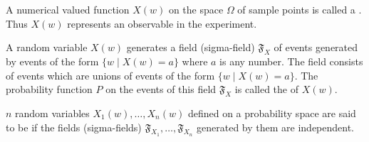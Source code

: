 A numerical valued function $X(w)$ on the space $\Omega$ of sample points is called a . Thus $X(w)$ represents an observable in the experiment.

A random variable $X(w)$ generates a field (sigma-field) $\mathfrak{F}_X$ of events generated by events of the form $\{w \mid X(w) = a\}$ where $a$ is any number. The field consists of events which are unions of events of the form $\{w \mid X(w) = a\}$. The probability function $P$ on the events of this field $\mathfrak{F}_X$ is called the  of $X(w)$.

$n$ random variables $X_1(w), \ldots, X_n(w)$ defined on a probability space are said to be  if the fields (sigma-fields) $\mathfrak{F}_{X_1}, \ldots, \mathfrak{F}_{X_n}$ generated by them are independent.
